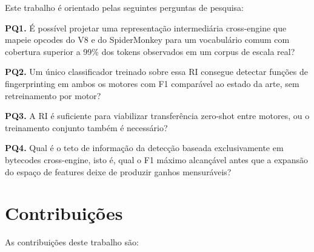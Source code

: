 Este trabalho é orientado pelas seguintes perguntas de pesquisa:

\textbf{PQ1.} É possível projetar uma representação intermediária cross-engine
que mapeie opcodes do V8 e do SpiderMonkey para um vocabulário comum com cobertura
superior a 99\% dos tokens observados em um corpus de escala real?

\textbf{PQ2.} Um único classificador treinado sobre essa RI consegue detectar
funções de fingerprinting em ambos os motores com F1 comparável ao estado
da arte, sem retreinamento por motor?

\textbf{PQ3.} A RI é suficiente para viabilizar transferência zero-shot entre
motores, ou o treinamento conjunto também é necessário?

\textbf{PQ4.} Qual é o teto de informação da detecção baseada exclusivamente em
bytecodes cross-engine, isto é, qual o F1 máximo alcançável antes que a
expansão do espaço de features deixe de produzir ganhos mensuráveis?

\section{Contribuições}
\label{sec:contribuicoes}

As contribuições deste trabalho são:

